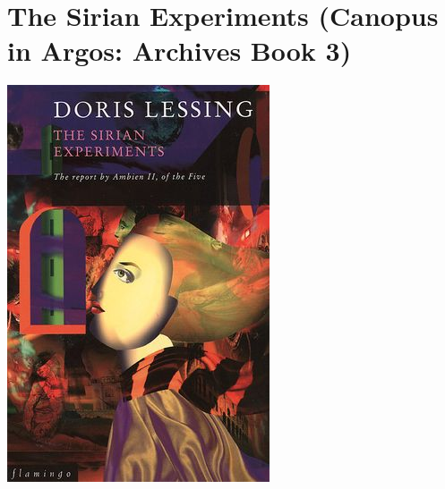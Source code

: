 \documentclass{tufte-handout}
\makeatletter
\newcommand{\varcaption}[2][0pt]{%
  \gsetlength{\@tufte@caption@vertical@offset}{-#1}%
  \gdef\@tufte@stored@varcaption{#2}%
}
\gdef\@tufte@stored@varcaption{} %
\makeatother
\begin{document}
\section*{The Sirian Experiments (Canopus in Argos: Archives Book 3)}
\begin{marginfigure}[19\baselineskip]
   \includegraphics[width=\linewidth]{images/sirian_experiments.jpg}
   \varcaption{\href{https://www.harpercollins.com.au/9780006547211/the-sirian-experiments/}{Publisher Link}, \href{https://www.amazon.com/Sirian-Experiments-Doris-May-Lessing/dp/0006547214/}{Amazon Link}}
\end{marginfigure}
\end{document}
